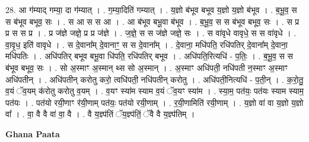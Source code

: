 \documentclass[17pt]{extarticle}
\begin{document}
28. आ ग॑म्याद् गम्या॒ दा ग॑म्यात् । . ग॒म्या॒दिति॑ गम्यात् । . य॒ज्ञो ब॑भूव बभूव य॒ज्ञो य॒ज्ञो ब॑भूव । . ब॒भू॒व॒ स स ब॑भूव बभूव॒ सः । . स आ स स आ । . आ ब॑भूव बभू॒वा ब॑भूव । . ब॒भू॒व॒ स स ब॑भूव बभूव॒ सः । . स प्र प्र स स प्र । . प्र ज॑ज्ञे जज्ञे॒ प्र प्र ज॑ज्ञे । . ज॒ज्ञे॒ स स ज॑ज्ञे जज्ञे॒ सः । . स वा॑वृधे वावृधे॒ स स वा॑वृधे । . वा॒वृ॒ध॒ इति॑ वावृधे । . स दे॒वाना᳚म् दे॒वानाꣳ॒॒ स स दे॒वाना᳚म् । . दे॒वाना॒ मधि॑पति॒ रधि॑पतिर् दे॒वाना᳚म् दे॒वाना॒ मधि॑पतिः । . अधि॑पतिर् बभूव बभू॒वा धि॑पति॒ रधि॑पतिर् बभूव । . अधि॑पति॒रित्यधि॑ - प॒तिः॒ । . ब॒भू॒व॒ स स ब॑भूव बभूव॒ सः । . सो अ॒स्माꣳ अ॒स्मान् थ्स सो अ॒स्मान् । . अ॒स्माꣳ अधि॑पती॒ नधि॑पती न॒स्माꣳ अ॒स्माꣳ अधि॑पतीन् । . अधि॑पतीन् करोतु करो॒ त्वधि॑पती॒ नधि॑पतीन् करोतु । . अधि॑पती॒नित्यधि॑ - प॒ती॒न् । . क॒रो॒तु॒ व॒यं ॅव॒यम् क॑रोतु करोतु व॒यम् । . व॒यꣳ स्या॑म स्याम व॒यं ॅव॒यꣳ स्या॑म । . स्या॒म॒ पत॑यः॒ पत॑यः स्याम स्याम॒ पत॑यः । . पत॑यो रयी॒णाꣳ र॑यी॒णाम् पत॑यः॒ पत॑यो रयी॒णाम् । . र॒यी॒णामिति॑ रयी॒णाम् । . य॒ज्ञो वा॑ वा य॒ज्ञो य॒ज्ञो वा᳚ । . वा॒ वै वै वा॑ वा॒ वै । . वै य॒ज्ञ्प॑तिं ॅय॒ज्ञ्प॑तिं॒ ॅवै वै य॒ज्ञ्प॑तिम् । \newline

\textbf{Ghana Paata } \newline
\end{document}
